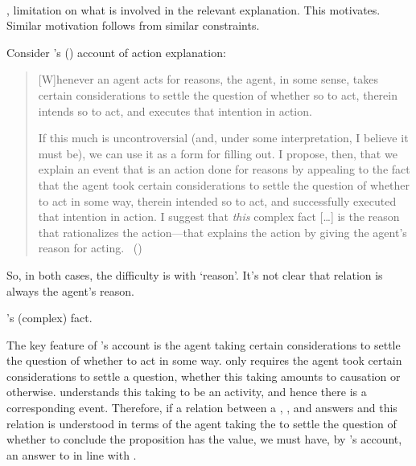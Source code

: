 \paragraph*{}

\begin{note}
  \cExpl{}, limitation on what is involved in the relevant explanation.
  This motivates.
  Similar motivation follows from similar constraints.
\end{note}

\begin{note}
  Consider \citeauthor{Hieronymi:2011aa}'s (\citeyear{Hieronymi:2011aa}) account of action explanation:

  \begin{quote}
    [W]henever an agent acts for reasons, the agent, in some sense, takes certain considerations to settle the question of whether so to act, therein intends so to act, and executes that intention in action.

    If this much is uncontroversial (and, under some interpretation, I believe it must be), we can use it as a form for filling out.
    I propose, then, that we explain an event that is an action done for reasons by appealing to the fact that the agent took certain considerations to settle the question of whether to act in some way, therein intended so to act, and successfully executed that intention in action.
    I suggest that \emph{this} complex fact [\dots] is the reason that rationalizes the action---that explains the action by giving the agent's reason for acting.%
    \mbox{ }\hfill\mbox{(\citeyear[421]{Hieronymi:2011aa})}
  \end{quote}

  {
    \color{red}
    So, in both cases, the difficulty is with `reason'.
    It's not clear that relation is always the agent's reason.
  }

  \citeauthor{Hieronymi:2011aa}'s (complex) fact.
\end{note}

\begin{note}
  The key feature of \citeauthor{Hieronymi:2011aa}'s account is the agent taking certain considerations to settle the question of whether to act in some way.
  \citeauthor{Hieronymi:2011aa} only requires the agent took certain considerations to settle a question, whether this taking amounts to causation or otherwise.
  \citeauthor{Hieronymi:2011aa} understands this taking to be an activity, and hence there is a corresponding event.
  Therefore, if a relation between a , , and \pool{} answers \qWhy{} and this relation is understood in terms of the agent taking the \pool{} to settle the question of whether to conclude the proposition has the value, we must have, by \citeauthor{Hieronymi:2011aa}'s account, an answer to \qHow{} in line with \issueInclusion{}.
\end{note}

